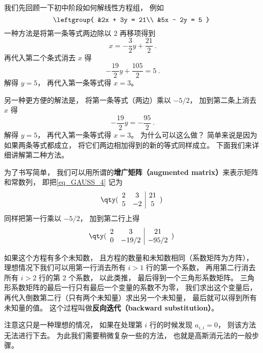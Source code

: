 \begin{example}{}\label{ex_GAUSS_1}
我们先回顾一下初中阶段如何解线性方程组， 例如
\begin{equation}\label{eq_GAUSS_4}
\leftgroup{
&2x + 3y = 21\\
&5x - 2y = 5
}~\end{equation}
一种方法是将第一条等式两边除以 2 再移项得到
\begin{equation}
x = - \frac32 y + \frac{21}{2}~.
\end{equation}
再代入第二个条式消去 $x$ 得
\begin{equation}
-\frac{19}{2} y + \frac{105}{2} = 5~.
\end{equation}
解得 $y = 5$， 再代入第一条等式得 $x = 3$。

另一种更方便的解法是， 将第一条等式（两边）乘以 $-5/2$， 加到第二条上消去 $x$ 得
\begin{equation}
-\frac{19}{2} y = -\frac{95}{2}~.
\end{equation}
解得 $y = 5$， 再代入第一条等式得 $x = 3$。 为什么可以这么做？  简单来说是因为如果两条等式都成立， 将它们两边相加得到的新的等式同样成立。 下面我们来详细讲解第二种方法。

为了书写简单， 我们可以用所谓的\textbf{增广矩阵（augmented matrix）}来表示矩阵和常数列， 即把\autoref{eq_GAUSS_4} 记为
\begin{equation}
\qty( \begin{array}{cc|c}
	2 & 3 & 21 \\
	5 & -2 & 5
	\end{array} 
)~\end{equation}
同样把第一行乘以 $-5/2$， 加到第二行上得
\begin{equation}
\qty( \begin{array}{cc|c}
	2 & 3 & 21 \\
	0 & -19/2 & -95/2
	\end{array} 
)~\end{equation}

如果这个方程有多个未知数， 且方程的数量和未知数相同（系数矩阵为方阵）， 理想情况下我们可以用第一行消去所有 $i > 1$ 行的第一个系数， 再用第二行消去所有 $i > 2$ 行的第 2 个系数， 以此类推， 最后得到一个三角形系数矩阵。 三角形系数矩阵的最后一行只有最后一个变量的系数不为零， 我们求出这个变量后， 再代入倒数第二行（只有两个未知量）求出另一个未知量， 最后就可以得到所有未知量的值。 这个过程叫做\textbf{反向迭代（backward substitution）}。%

注意这只是一种理想的情况， 如果在处理第 $i$ 行的时候发现 $a_{i,i} = 0$， 则该方法无法进行下去。 为此我们需要稍微复杂一些的方法， 也就是高斯消元法的一般步骤。
\end{example}

